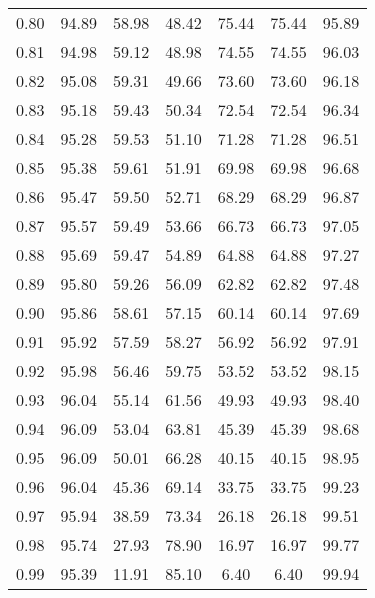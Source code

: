 \begin{tabular}{|c|c|c|c|c|c|c|}
      0.80 &     94.89 &     58.98 &      48.42 &   75.44 &      75.44 &         95.89 \\
      0.81 &     94.98 &     59.12 &      48.98 &   74.55 &      74.55 &         96.03 \\
      0.82 &     95.08 &     59.31 &      49.66 &   73.60 &      73.60 &         96.18 \\
      0.83 &     95.18 &     59.43 &      50.34 &   72.54 &      72.54 &         96.34 \\
      0.84 &     95.28 &     59.53 &      51.10 &   71.28 &      71.28 &         96.51 \\
      0.85 &     95.38 &     59.61 &      51.91 &   69.98 &      69.98 &         96.68 \\
      0.86 &     95.47 &     59.50 &      52.71 &   68.29 &      68.29 &         96.87 \\
      0.87 &     95.57 &     59.49 &      53.66 &   66.73 &      66.73 &         97.05 \\
      0.88 &     95.69 &     59.47 &      54.89 &   64.88 &      64.88 &         97.27 \\
      0.89 &     95.80 &     59.26 &      56.09 &   62.82 &      62.82 &         97.48 \\
      0.90 &     95.86 &     58.61 &      57.15 &   60.14 &      60.14 &         97.69 \\
      0.91 &     95.92 &     57.59 &      58.27 &   56.92 &      56.92 &         97.91 \\
      0.92 &     95.98 &     56.46 &      59.75 &   53.52 &      53.52 &         98.15 \\
      0.93 &     96.04 &     55.14 &      61.56 &   49.93 &      49.93 &         98.40 \\
      0.94 &     96.09 &     53.04 &      63.81 &   45.39 &      45.39 &         98.68 \\
      0.95 &     96.09 &     50.01 &      66.28 &   40.15 &      40.15 &         98.95 \\
      0.96 &     96.04 &     45.36 &      69.14 &   33.75 &      33.75 &         99.23 \\
      0.97 &     95.94 &     38.59 &      73.34 &   26.18 &      26.18 &         99.51 \\
      0.98 &     95.74 &     27.93 &      78.90 &   16.97 &      16.97 &         99.77 \\
      0.99 &     95.39 &     11.91 &      85.10 &    6.40 &       6.40 &         99.94 \\
\bottomrule
\end{tabular}
